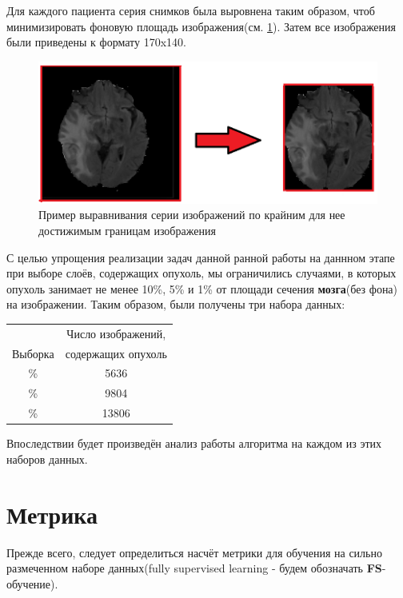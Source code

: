 Для каждого пациента серия снимков была выровнена таким образом, чтоб минимизировать фоновую площадь изображения(см. \ref{fig:transform}). Затем все изображения были приведены к формату 170x140.

\begin{figure}[ht] 
  \center
  \includegraphics [scale=0.6] {images/transform.png}
  \caption{ Пример выравнивания серии изображений по крайним для нее достижимым границам изображения} 
  \label{fig:transform}  
\end{figure}

С целью упрощения реализации задач данной ранной работы на даннном этапе при выборе слоёв, содержащих опухоль, мы ограничились случаями, в которых опухоль занимает не менее 10\%, 5\% и 1\% от площади сечения {\bf мозга}(без фона) на изображении. Таким образом, были получены три набора данных:

\begin{center}
 \begin{tabular}{||c c ||} 
 \hline
  & Число изображений,  \\ [0.5ex]
  Выборка & содержащих опухоль \\
 \hline\hline
 \ge 10\% & 5636  \\ 
 \hline
 \ge 5\% & 9804 \\
 \hline
 \ge 1\% & 13806  \\[1ex] 
 \hline

 \hline
\end{tabular}
\end{center}

Впоследствии будет произведён анализ работы алгоритма на каждом из этих наборов данных.


\section{Метрика}

Прежде всего, следует определиться насчёт метрики для обучения на сильно размеченном наборе данных(fully supervised learning - будем обозначать {\bf FS}- обучение). 


